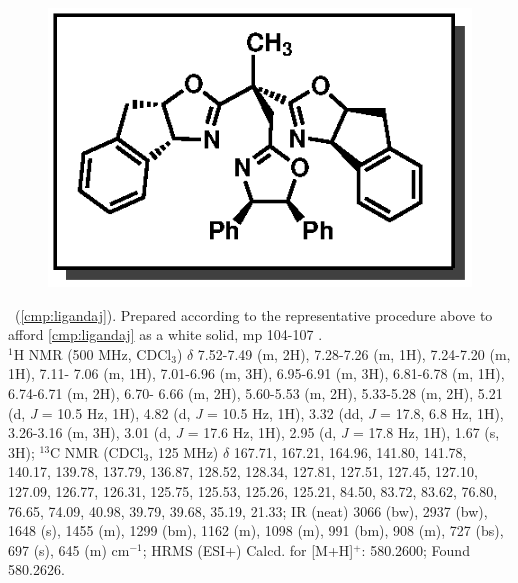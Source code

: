 \vspace{10pt}
\begin{figure}
  \vspace{-20pt}
  \begin{center}
    \includegraphics[scale=0.8]{chp_asymmetric/images/ligandaj}
  \end{center}
  \vspace{-25pt}
\end{figure}
\noindent \textbf{\CMPligandaj}\ (\ref{cmp:ligandaj}). Prepared according to the representative
procedure above to afford \ref{cmp:ligandaj} as a white solid, mp 104-107 \degc. \\
$^1$H NMR (500 MHz, CDCl$_3$) $\delta$ 7.52-7.49 (m, 2H), 7.28-7.26 (m, 1H), 7.24-7.20 (m, 1H),
7.11- 7.06 (m, 1H), 7.01-6.96 (m, 3H), 6.95-6.91 (m, 3H), 6.81-6.78 (m, 1H), 6.74-6.71 (m, 2H),
6.70- 6.66 (m, 2H), 5.60-5.53 (m, 2H), 5.33-5.28 (m, 2H), 5.21 (d, \textit{J} = 10.5 Hz, 1H), 4.82
(d, \textit{J} = 10.5 Hz, 1H), 3.32 (dd, \textit{J} = 17.8, 6.8 Hz, 1H), 3.26-3.16 (m, 3H), 3.01 (d,
\textit{J} = 17.6 Hz, 1H), 2.95 (d, \textit{J} = 17.8 Hz, 1H), 1.67 (s, 3H); $^{13}$C NMR (CDCl$_3$,
125 MHz) $\delta$ 167.71, 167.21, 164.96, 141.80, 141.78, 140.17, 139.78, 137.79, 136.87, 128.52,
128.34, 127.81, 127.51, 127.45, 127.10, 127.09, 126.77, 126.31, 125.75, 125.53, 125.26, 125.21,
84.50, 83.72, 83.62, 76.80, 76.65, 74.09, 40.98, 39.79, 39.68, 35.19, 21.33; IR (neat) 3066 (bw),
2937 (bw), 1648 (s), 1455 (m), 1299 (bm), 1162 (m), 1098 (m), 991 (bm), 908 (m), 727 (bs), 697 (s),
645 (m) cm$^{-1}$; HRMS (ESI+) Calcd. for  [M+H]$^+$: 580.2600; Found 580.2626.

